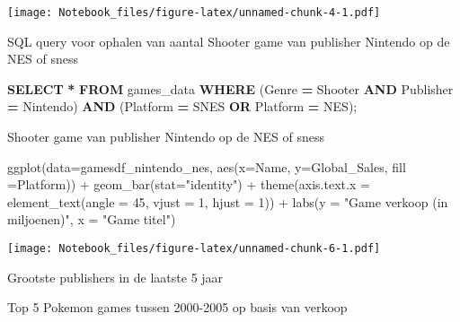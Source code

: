 \documentclass[
]{article}
\newenvironment{Shaded}{\begin{snugshade}}{\end{snugshade}}
\newcommand{\AttributeTok}[1]{\textcolor[rgb]{0.77,0.63,0.00}{#1}}
\newcommand{\DecValTok}[1]{\textcolor[rgb]{0.00,0.00,0.81}{#1}}
\newcommand{\FunctionTok}[1]{\textcolor[rgb]{0.00,0.00,0.00}{#1}}
\newcommand{\KeywordTok}[1]{\textcolor[rgb]{0.13,0.29,0.53}{\textbf{#1}}}
\newcommand{\NormalTok}[1]{#1}
\newcommand{\OperatorTok}[1]{\textcolor[rgb]{0.81,0.36,0.00}{\textbf{#1}}}
\newcommand{\SpecialCharTok}[1]{\textcolor[rgb]{0.00,0.00,0.00}{#1}}
\newcommand{\StringTok}[1]{\textcolor[rgb]{0.31,0.60,0.02}{#1}}
\begin{document}
\texttt{[image: Notebook\_files/figure-latex/unnamed-chunk-4-1.pdf]}

SQL query voor ophalen van aantal Shooter game van publisher Nintendo op
de NES of sness

\begin{Shaded}
\begin{Highlighting}[]
\KeywordTok{SELECT} \OperatorTok{*}
  \KeywordTok{FROM}\NormalTok{ games\_data}
    \KeywordTok{WHERE}\NormalTok{ (Genre }\OperatorTok{=} \StringTok{\textquotesingle{}Shooter\textquotesingle{}} \KeywordTok{AND}\NormalTok{ Publisher }\OperatorTok{=} \StringTok{\textquotesingle{}Nintendo\textquotesingle{}}\NormalTok{) }
      \KeywordTok{AND}\NormalTok{ (Platform }\OperatorTok{=} \StringTok{\textquotesingle{}SNES\textquotesingle{}} \KeywordTok{OR}\NormalTok{ Platform }\OperatorTok{=} \StringTok{\textquotesingle{}NES\textquotesingle{}}\NormalTok{);}
\end{Highlighting}
\end{Shaded}

Shooter game van publisher Nintendo op de NES of sness

\begin{Shaded}
\begin{Highlighting}[]
\FunctionTok{ggplot}\NormalTok{(}\AttributeTok{data=}\NormalTok{gamesdf\_nintendo\_nes,}
  \FunctionTok{aes}\NormalTok{(}\AttributeTok{x=}\NormalTok{Name, }\AttributeTok{y=}\NormalTok{Global\_Sales, }\AttributeTok{fill =}\NormalTok{Platform)) }\SpecialCharTok{+}
    \FunctionTok{geom\_bar}\NormalTok{(}\AttributeTok{stat=}\StringTok{"identity"}\NormalTok{) }\SpecialCharTok{+}
    \FunctionTok{theme}\NormalTok{(}\AttributeTok{axis.text.x =} \FunctionTok{element\_text}\NormalTok{(}\AttributeTok{angle =} \DecValTok{45}\NormalTok{, }\AttributeTok{vjust =} \DecValTok{1}\NormalTok{, }\AttributeTok{hjust =} \DecValTok{1}\NormalTok{)) }\SpecialCharTok{+}
       \FunctionTok{labs}\NormalTok{(}\AttributeTok{y =} \StringTok{"Game verkoop (in miljoenen)"}\NormalTok{, }\AttributeTok{x =} \StringTok{"Game titel"}\NormalTok{)}
\end{Highlighting}
\end{Shaded}

\texttt{[image: Notebook\_files/figure-latex/unnamed-chunk-6-1.pdf]}

Grootste publishers in de laatste 5 jaar

Top 5 Pokemon games tussen 2000-2005 op basis van verkoop
\end{document}
